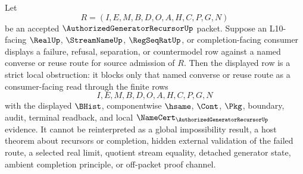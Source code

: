 \begin{corollary}
\label{cor:authorized-generator-recursor-l10-source-admission-strict-obstruction}
Let
$$
R=(I,E,M,B,D,O,A,H,C,P,G,N)
$$
be an accepted $\AuthorizedGeneratorRecursorUp$ packet. Suppose an L10-facing $\RealUp$, $\StreamNameUp$, $\RegSeqRatUp$, or completion-facing consumer displays a failure, refusal, separation, or countermodel row against a named converse or reuse route for source admission of $R$. Then the displayed row is a strict local obstruction: it blocks only that named converse or reuse route as a consumer-facing read through the finite rows
$$
I,E,M,B,D,O,A,H,C,P,G,N
$$
with the displayed $\BHist$, componentwise $\hsame$, $\Cont$, $\Pkg$, boundary, audit, terminal readback, and local $\NameCert_{\AuthorizedGeneratorRecursorUp}$ evidence. It cannot be reinterpreted as a global impossibility result, a host theorem about recursors or completion, hidden external validation of the failed route, a selected real limit, quotient stream equality, detached generator state, ambient completion principle, or off-packet proof channel.
\end{corollary}
